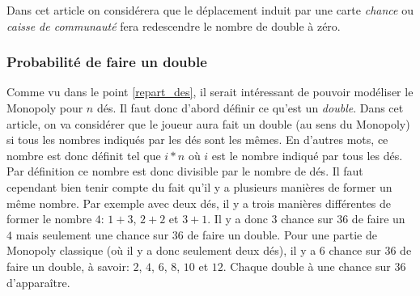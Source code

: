\documentclass[letterpaper]{article}
\begin{document}
      Dans cet article on considérera que le déplacement induit par une carte
      \textit{chance} ou \textit{caisse de communauté} fera redescendre le nombre
      de double à zéro.

    \subsubsection{Probabilité de faire un double}
      \label{prob_double}
      Comme vu dans le point \ref{repart_des}, il serait intéressant de
      pouvoir modéliser le Monopoly pour $n$ dés.  Il faut donc d'abord
      définir ce qu'est un \textit{double}.  Dans cet article, on va
      considérer que le joueur aura fait un double (au sens du Monopoly)
      si tous les nombres indiqués par les dés sont les mêmes. En d'autres
      mots, ce nombre est donc définit tel que $i*n$ où $i$ est le nombre
      indiqué par tous les dés.  Par définition ce nombre est donc
      divisible par le nombre de dés.
      Il faut cependant bien tenir compte du fait qu'il y a plusieurs
      manières de former un même nombre.  Par exemple avec deux dés,
      il y a trois manières différentes de former le nombre $4$:
      $1+3$, $2+2$ et $3+1$.  Il y a donc 3 chance sur 36 de faire un
      $4$ mais seulement une chance sur 36 de faire un double.
      Pour une partie de Monopoly classique (où il y a donc seulement
      deux dés), il y a 6 chance sur 36 de faire un double, à savoir:
      $2$, $4$, $6$, $8$, $10$ et $12$.  Chaque double à une chance
      sur 36 d'apparaître.
\end{document}
